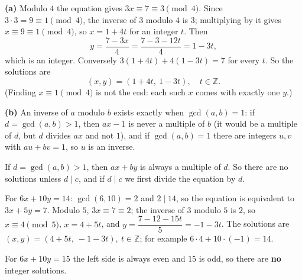 \textbf{(a)} Modulo $4$ the equation gives $3x\equiv7\equiv3\pmod4$. Since $3\cdot3=9\equiv1\pmod4$, the inverse of $3$ modulo $4$ is $3$; multiplying by it gives $x\equiv9\equiv1\pmod4$, so $x=1+4t$ for an integer $t$. Then
\[y=\dfrac{7-3x}{4}=\dfrac{7-3-12t}{4}=1-3t,\]
which is an integer. Conversely $3(1+4t)+4(1-3t)=7$ for every $t$. So the solutions are
\[\boxed{(x,y)=(1+4t,\ 1-3t),\quad t\in\mathbb Z}.\]
(Finding $x\equiv1\pmod4$ is not the end: each such $x$ comes with exactly one $y$.)

\textbf{(b)} An inverse of $a$ modulo $b$ exists exactly when $\gcd(a,b)=1$: if $d=\gcd(a,b)>1$, then $ax-1$ is never a multiple of $b$ (it would be a multiple of $d$, but $d$ divides $ax$ and not $1$), and if $\gcd(a,b)=1$ there are integers $u,v$ with $au+bv=1$, so $u$ is an inverse.

If $d=\gcd(a,b)>1$, then $ax+by$ is always a multiple of $d$. So there are no solutions unless $d\mid c$, and if $d\mid c$ we first divide the equation by $d$.

For $6x+10y=14$: $\gcd(6,10)=2$ and $2\mid14$, so the equation is equivalent to $3x+5y=7$. Modulo $5$, $3x\equiv7\equiv2$; the inverse of $3$ modulo $5$ is $2$, so $x\equiv4\pmod5$, $x=4+5t$, and $y=\dfrac{7-12-15t}{5}=-1-3t$. The solutions are $\boxed{(x,y)=(4+5t,\ -1-3t),\ t\in\mathbb Z}$; for example $6\cdot4+10\cdot(-1)=14$.

For $6x+10y=15$ the left side is always even and $15$ is odd, so there are \textbf{no} integer solutions.
